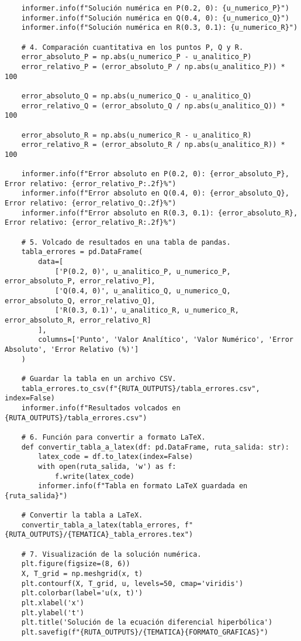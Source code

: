\begin{verbatim}
    informer.info(f"Solución numérica en P(0.2, 0): {u_numerico_P}")
    informer.info(f"Solución numérica en Q(0.4, 0): {u_numerico_Q}")
    informer.info(f"Solución numérica en R(0.3, 0.1): {u_numerico_R}")
    
    # 4. Comparación cuantitativa en los puntos P, Q y R.
    error_absoluto_P = np.abs(u_numerico_P - u_analitico_P)
    error_relativo_P = (error_absoluto_P / np.abs(u_analitico_P)) * 100
    
    error_absoluto_Q = np.abs(u_numerico_Q - u_analitico_Q)
    error_relativo_Q = (error_absoluto_Q / np.abs(u_analitico_Q)) * 100
    
    error_absoluto_R = np.abs(u_numerico_R - u_analitico_R)
    error_relativo_R = (error_absoluto_R / np.abs(u_analitico_R)) * 100
    
    informer.info(f"Error absoluto en P(0.2, 0): {error_absoluto_P}, Error relativo: {error_relativo_P:.2f}%")
    informer.info(f"Error absoluto en Q(0.4, 0): {error_absoluto_Q}, Error relativo: {error_relativo_Q:.2f}%")
    informer.info(f"Error absoluto en R(0.3, 0.1): {error_absoluto_R}, Error relativo: {error_relativo_R:.2f}%")
    
    # 5. Volcado de resultados en una tabla de pandas.
    tabla_errores = pd.DataFrame(
        data=[
            ['P(0.2, 0)', u_analitico_P, u_numerico_P, error_absoluto_P, error_relativo_P],
            ['Q(0.4, 0)', u_analitico_Q, u_numerico_Q, error_absoluto_Q, error_relativo_Q],
            ['R(0.3, 0.1)', u_analitico_R, u_numerico_R, error_absoluto_R, error_relativo_R]
        ],
        columns=['Punto', 'Valor Analítico', 'Valor Numérico', 'Error Absoluto', 'Error Relativo (%)']
    )
    
    # Guardar la tabla en un archivo CSV.
    tabla_errores.to_csv(f"{RUTA_OUTPUTS}/tabla_errores.csv", index=False)
    informer.info(f"Resultados volcados en {RUTA_OUTPUTS}/tabla_errores.csv")

    # 6. Función para convertir a formato LaTeX.
    def convertir_tabla_a_latex(df: pd.DataFrame, ruta_salida: str):
        latex_code = df.to_latex(index=False)
        with open(ruta_salida, 'w') as f:
            f.write(latex_code)
        informer.info(f"Tabla en formato LaTeX guardada en {ruta_salida}")
    
    # Convertir la tabla a LaTeX.
    convertir_tabla_a_latex(tabla_errores, f"{RUTA_OUTPUTS}/{TEMATICA}_tabla_errores.tex")
    
    # 7. Visualización de la solución numérica.
    plt.figure(figsize=(8, 6))
    X, T_grid = np.meshgrid(x, t)
    plt.contourf(X, T_grid, u, levels=50, cmap='viridis')
    plt.colorbar(label='u(x, t)')
    plt.xlabel('x')
    plt.ylabel('t')
    plt.title('Solución de la ecuación diferencial hiperbólica')
    plt.savefig(f"{RUTA_OUTPUTS}/{TEMATICA}{FORMATO_GRAFICAS}")


\end{verbatim}